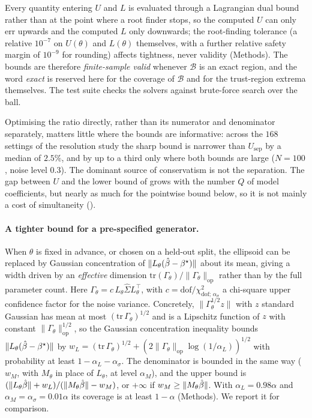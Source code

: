 Every quantity entering $U$ and $L$ is evaluated through a Lagrangian dual
bound rather than at the point where a root finder stops, so the computed $U$
can only err upwards and the computed $L$ only downwards; the root-finding
tolerance (a relative $10^{-7}$ on $U(\theta)$ and $L(\theta)$ themselves, with a further
relative safety margin of $10^{-9}$ for rounding) affects tightness, never
validity (Methods). The bounds are therefore \emph{finite-sample valid}
whenever $\mathcal B$ is an exact region, and the word \emph{exact} is reserved
here for the coverage of $\mathcal B$ and for the trust-region extrema
themselves. The test suite checks the solvers against brute-force search over
the ball.

Optimising the ratio directly, rather than its numerator and denominator
separately, matters little where the bounds are informative: across the $168$
settings of the resolution study the sharp bound is narrower than
$U_{\mathrm{sep}}$ by a median of $2.5\%$, and by up to a third only where both
bounds are large ($N = 100$, noise level $0.3$). The dominant source of
conservatism is not the separation. The gap between $U$ and the lower bound of
 grows with the number $Q$ of model coefficients, but nearly
as much for the pointwise bound below, so it is not mainly a cost of
simultaneity ().

\paragraph{A tighter bound for a pre-specified generator.} When $\theta$ is
fixed in advance, or chosen on a held-out split, the ellipsoid can be replaced
by Gaussian concentration of $\|L_\theta(\hat{\beta} - \beta^\star)\|$ about its
mean, giving a width driven by an \emph{effective} dimension
$\mathrm{tr}(\Gamma_\theta)/\|\Gamma_\theta\|_{\mathrm{op}}$ rather than by the
full parameter count. Here $\Gamma_\theta = c\,L_\theta \hat\Sigma
L_\theta^{\!\top}$, with $c = \mathrm{dof}/\chi^2_{\mathrm{dof};\,\alpha_\sigma}$
a chi-square upper confidence factor for the noise variance. Concretely,
$\|\Gamma_\theta^{1/2} z\|$ with $z$ standard Gaussian has mean at most
$(\mathrm{tr}\,\Gamma_\theta)^{1/2}$ and is a Lipschitz function of $z$ with
constant $\|\Gamma_\theta\|_{\mathrm{op}}^{1/2}$, so the Gaussian concentration
inequality \citep{borell1975brunn,cirelson1976norms,boucheron2013concentration}
bounds $\|L_\theta(\hat{\beta} - \beta^\star)\|$ by $w_L =
(\mathrm{tr}\,\Gamma_\theta)^{1/2} +
(2\|\Gamma_\theta\|_{\mathrm{op}}\log(1/\alpha_L))^{1/2}$ with probability at
least $1 - \alpha_L - \alpha_\sigma$. The denominator is bounded in the same
way ($w_M$, with $M_\theta$ in place of $L_\theta$, at level $\alpha_M$), and
the upper bound is $(\|L_\theta\hat{\beta}\| + w_L)/(\|M_\theta\hat{\beta}\| - w_M)$, or
$+\infty$ if $w_M \ge \|M_\theta\hat{\beta}\|$. With $\alpha_L = 0.98\alpha$ and
$\alpha_M = \alpha_\sigma = 0.01\alpha$ its coverage is at least $1-\alpha$
(Methods). We report it for comparison.

